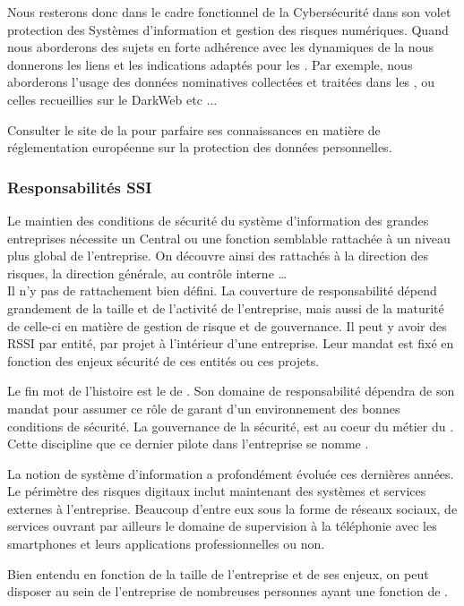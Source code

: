 Nous resterons donc dans le cadre fonctionnel de la Cybersécurité dans son volet protection des Systèmes d'information et gestion des risques numériques.
Quand nous aborderons des sujets en forte adhérence avec les dynamiques de la  nous donnerons les liens et les indications adaptés pour les .
Par exemple, nous aborderons l'usage des données nominatives collectées et traitées dans les , ou celles recueillies sur le DarkWeb etc ...

Consulter le site de la  pour parfaire ses connaissances en matière de réglementation européenne sur la protection des données personnelles. 


\subsubsection{Responsabilités SSI}

Le maintien des conditions de sécurité du système d'information des grandes entreprises nécessite un  Central ou une fonction semblable rattachée à un niveau plus global de l'entreprise.
On découvre ainsi des   rattachés à la direction des risques, la direction générale, au contrôle interne …\\
 Il n'y pas de rattachement bien défini. La couverture de responsabilité dépend grandement de la taille et de l'activité de l'entreprise, mais aussi de la maturité de celle-ci en matière de gestion de risque et de gouvernance. Il peut y avoir des RSSI par entité, par projet à l’intérieur d'une entreprise. Leur mandat est fixé en fonction des enjeux sécurité de ces entités ou ces projets. 

Le fin mot de l'histoire est le  de  . Son domaine de responsabilité dépendra de son mandat pour assumer ce rôle de garant d'un environnement  des bonnes conditions de sécurité.
La gouvernance de la sécurité, est au coeur du métier du  . Cette discipline que ce dernier pilote dans l’entreprise se nomme .

La notion de système d'information a profondément évoluée ces dernières années. Le périmètre des risques digitaux inclut maintenant des systèmes et services externes à l'entreprise. Beaucoup d'entre eux sous la forme de réseaux sociaux, de services 
 ouvrant par ailleurs le domaine de supervision à la téléphonie avec les smartphones et leurs applications professionnelles ou non.

Bien entendu en fonction de la taille de l'entreprise et de ses enjeux, on peut disposer au sein de l'entreprise de nombreuses personnes ayant une fonction de . 

